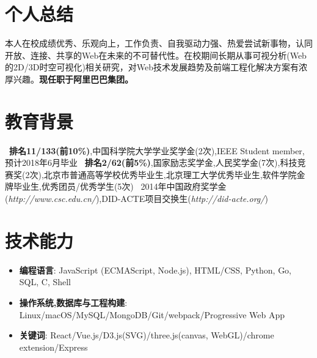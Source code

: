 \documentclass{resume}
\begin{document}

\name{}

 
\section{个人总结}
本人在校成绩优秀、乐观向上，工作负责、自我驱动力强、热爱尝试新事物，认同开放、连接、共享的Web在未来的不可替代性。在校期间长期从事可视分析(Web的2D/3D时空可视化)相关研究，对Web技术发展趋势及前端工程化解决方案有浓厚兴趣。\textbf{现任职于阿里巴巴集团。}

\section{教育背景}
\ \textbf{排名11/133(前10\%)},中国科学院大学学业奖学金(2次),IEEE Student member,预计2018年6月毕业
\ \textbf{排名2/62(前5\%)},国家励志奖学金,人民奖学金(7次),科技竞赛奖(2次),北京市普通高等学校优秀毕业生,北京理工大学优秀毕业生,软件学院金牌毕业生,优秀团员/优秀学生(5次)
\ 2014年中国政府奖学金(\textit{http://www.csc.edu.cn/}),DID-ACTE项目交换生(\textit{http://did-acte.org/})

\section{技术能力}
\begin{itemize}[parsep=0.2ex]
  \item \textbf{编程语言}: JavaScript (ECMAScript, Node.js), HTML/CSS, Python, Go, SQL, C, Shell
  \item \textbf{操作系统,数据库与工程构建}: Linux/macOS/MySQL/MongoDB/Git/webpack/Progressive Web App
  \item \textbf{关键词}: React/Vue.js/D3.js(SVG)/three.js(canvas, WebGL)/chrome extension/Express
\end{itemize}
\end{document}
